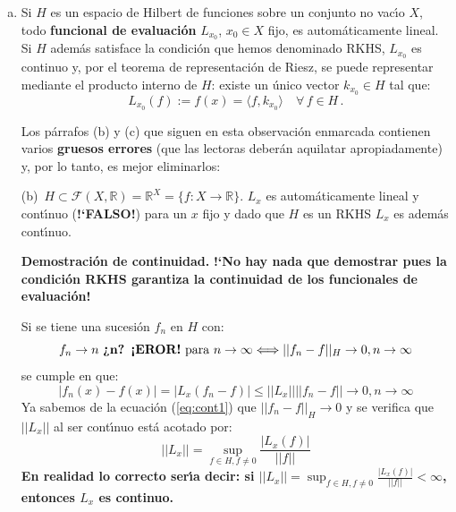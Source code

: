 \begin{enumerate}[(a)]
\item
Si $H$ es un espacio de Hilbert de funciones sobre un conjunto no
vac\'\i o $X$, todo {\color{red} \bf funcional de evaluaci\'on}
$L_{x_0}$, $x_0\in X$ fijo, es autom\'aticamente lineal.
Si $H$ adem\'as satisface la condici\'on que hemos denominado RKHS,
$L_{x_0}$ es continuo y, por el teorema de representaci\'on de Riesz,
se puede representar mediante el producto interno de $H$:
existe un \'unico vector $k_{x_0}\in H$ tal que:
\begin{equation*}
L_{x_0}(f):= f(x)= \langle f,k_{x_0}\rangle\quad\forall\,f\in H\,.
\end{equation*}

\begin{myremark}
Los p\'arrafos (b) y (c) que siguen en esta observaci\'on enmarcada
contienen varios {\bf gruesos errores} (que las lectoras deber\'an
aquilatar apropiadamente) y, por lo tanto, es mejor eliminarlos:

(b)\ $H\subset\mathcal{F}(X,\mathbb{R})
=\mathbb{R}^X=\{f:X \rightarrow \mathbb{R}\}$. 
$L_x$ es autom\'aticamente lineal y cont\'\i nuo ({\bf !`FALSO!})
para un $x$ fijo y dado que $H$ es un RKHS $L_x$ es adem\'as cont\'\i nuo.

\smallskip\noindent
\textbf{Demostraci\'on de continuidad.}\quad
{\bf !`No hay nada que demostrar pues la condici\'on RKHS garantiza
la continuidad de los funcionales de evaluaci\'on!}

Si se tiene una sucesi\'on ${f_n}$ en $H$ con:
\begin{equation}\label{eq:cont1}
f_n \rightarrow n\ \text{{\bf ?`n? !`EROR!} para } n \rightarrow \infty 
\Longleftrightarrow ||f_n-f||_H \rightarrow 0, n\rightarrow \infty
\end{equation}
se cumple en que:
\begin{equation*}
|f_n(x) - f(x) | 
= | L_x(f_n-f) | \leq ||L_x|| ||f_n-f|| \rightarrow 0, n\rightarrow \infty
\end{equation*}
Ya sabemos de la ecuaci\'on (\ref{eq:cont1}) que 
$||f_n-f||_H \rightarrow 0$ y se verifica que $||L_x||$ 
al ser cont\'\i nuo est\'a acotado por:
\begin{equation*}
||L_x|| = \sup_{f \in H,f \neq 0} \frac{|L_x(f)|}{||f||}
\end{equation*}
{\bf En realidad lo correcto ser\'\i a decir: si
$||L_x|| = \sup_{f \in H,f \neq 0} \frac{|L_x(f)|}{||f||}<\infty$,
entonces $L_x$ es continuo.}


\end{myremark}
\end{enumerate}
